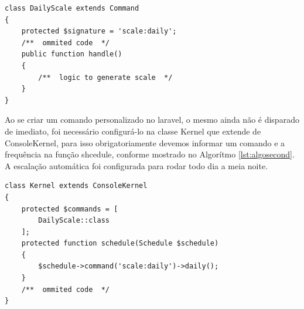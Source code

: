 \begin{lstlisting}[frame=single, caption={Classe responsável por gerar escala}, label={lst:algofirst}]
class DailyScale extends Command
{
    protected $signature = 'scale:daily';
    /**  ommited code  */
    public function handle()
    {
        /**  logic to generate scale  */
    }
}
\end{lstlisting}

Ao se criar um comando personalizado no laravel, o mesmo ainda não é disparado de imediato, foi necessário configurá-lo na classe Kernel que extende de ConsoleKernel, para isso obrigatoriamente devemos informar um comando e a frequência na função shcedule, conforme mostrado no Algorítmo \ref{lst:algosecond}. A escalação automática foi configurada para rodar todo dia a meia noite.

\begin{lstlisting}[frame=single, caption={Configuração da geração da escala}, label={lst:algosecond}]
class Kernel extends ConsoleKernel
{
    protected $commands = [
        DailyScale::class
    ];
    protected function schedule(Schedule $schedule)
    {
        $schedule->command('scale:daily')->daily();
    }
    /**  ommited code  */
}
\end{lstlisting}
